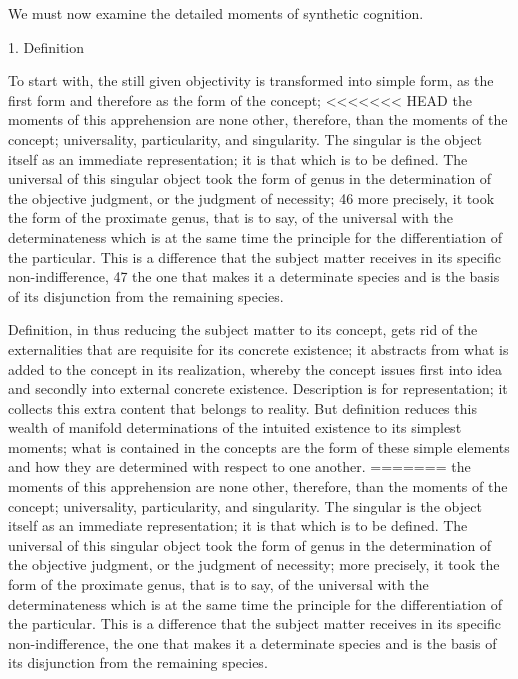 We must now examine the detailed
moments of synthetic cognition.

1. Definition

To start with, the still given objectivity is
transformed into simple form, as the first form
and therefore as the form of the concept;
<<<<<<< HEAD
the moments of this
apprehension are none other, therefore, than the moments of the concept;
universality, particularity, and singularity.
The singular is the object itself as
an immediate representation; it is that which is to be defined. The universal
of this singular object took the form of genus in the determination of
the objective judgment, or the judgment of necessity; 46 more precisely,
it took the form of the proximate genus, that is to say, of the universal
with the determinateness which is at the same time the principle for the
differentiation of the particular. This is a difference that the subject matter
receives in its specific non-indifference, 47 the one that makes it a determinate
species and is the basis of its disjunction from the remaining species.

Definition, in thus reducing the subject matter to its concept, gets rid of
the externalities that are requisite for its concrete existence;
 it abstracts from
what is added to the concept in its realization,
 whereby the concept issues
first into idea and secondly into external concrete existence. Description is
for representation;
it collects this extra content that belongs to reality.
 But
definition reduces this wealth of manifold determinations of the intuited
existence to its simplest moments;
 what is contained in the concepts are the
form of these simple elements and how they are determined with respect
to one another.
=======
the moments of this apprehension are none other, therefore,
than the moments of the concept;
universality, particularity, and singularity.
The singular is the object itself as
an immediate representation;
it is that which is to be defined.
The universal of this singular object
took the form of genus in
the determination of the objective judgment,
or the judgment of necessity;
more precisely, it took the form of the proximate genus,
that is to say, of the universal with the determinateness
which is at the same time the principle for
the differentiation of the particular.
This is a difference that the subject matter
receives in its specific non-indifference,
the one that makes it a determinate species
and is the basis of its disjunction
from the remaining species.

